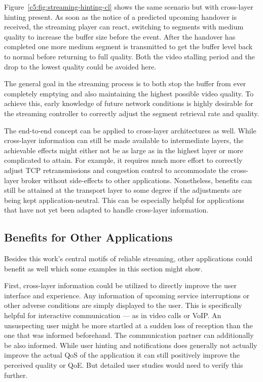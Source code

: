 Figure~\ref{c5:fig:streaming-hinting-cl} shows the same scenario but with cross-layer hinting present. As soon as the notice of a predicted upcoming handover is received, the streaming player can react, switching to segments with medium quality to increase the buffer size before the event. After the handover has completed one more medium segment is transmitted to get the buffer level back to normal before returning to full quality. Both the video stalling period and the drop to the lowest quality could be avoided here.

The general goal in the streaming process is to both stop the buffer from ever completely emptying and also maintaining the highest possible video quality. To achieve this, early knowledge of future network conditions is highly desirable for the streaming controller to correctly adjust the segment retrieval rate and quality.

The end-to-end concept can be applied to cross-layer architectures as well. While cross-layer information can still be made available to intermediate layers, the achievable effects might either not be as large as in the highest layer or more complicated to attain. For example, it requires much more effort to correctly adjust \gls{TCP} retransmissions and congestion control to accommodate the cross-layer broker without side-effects to other applications. Nonetheless, benefits can still be attained at the transport layer to some degree if the adjustments are being kept application-neutral. This can be especially helpful for applications that have not yet been adapted to handle cross-layer information.


\subsection{Benefits for Other Applications}

Besides this work's central motifs of reliable streaming, other applications could benefit as well which some examples in this section might show.

First, cross-layer information could be utilized to directly improve the user interface and experience. Any information of upcoming service interruptions or other adverse conditions are simply displayed to the user. This is specifically helpful for interactive communication --- as in video calls or \gls{VoIP}. An unsuspecting user might be more startled at a sudden loss of reception than the one that was informed beforehand. The communication partner can additionally be also informed. While user hinting and notifications does generally not actually improve the actual \gls{QoS} of the application it can still positively improve the perceived quality or \gls{QoE}. But detailed user studies would need to verify this further.

